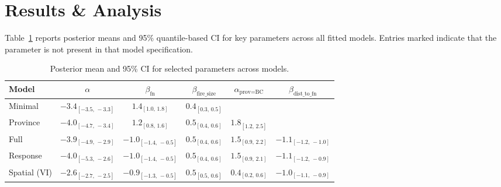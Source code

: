 \section{Results \& Analysis}\label{sec:results}

Table~\ref{tab:key_param_comparison} reports posterior means and 95\% quantile-based CI for key parameters across all fitted models. Entries marked \textemdash{} indicate that the parameter is not present in that model specification.

\begin{table}[h!]
\centering
\caption{Posterior mean and 95\% CI for selected parameters across models.}
\label{tab:key_param_comparison}
\begin{tabular}{lccccc}
\hline
Model & $\alpha$ & $\beta_{\mathrm{fn}}$ & $\beta_{\mathrm{fire\_size}}$ & $\alpha_{\text{prov=BC}}$ & $\beta_{\mathrm{dist\_to\_fn}}$ \\
\hline
Minimal & $-3.4_{[-3.5,\,-3.3]}$ & $1.4_{[1.0,\,1.8]}$ & $0.4_{[0.3,\,0.5]}$ & \textemdash{} & \textemdash{} \\
Province & $-4.0_{[-4.7,\,-3.4]}$ & $1.2_{[0.8,\,1.6]}$ & $0.5_{[0.4,\,0.6]}$ & $1.8_{[1.2,\,2.5]}$ & \textemdash{} \\
Full & $-3.9_{[-4.9,\,-2.9]}$ & $-1.0_{[-1.4,\,-0.5]}$ & $0.5_{[0.4,\,0.6]}$ & $1.5_{[0.9,\,2.2]}$ & $-1.1_{[-1.2,\,-1.0]}$ \\
Response & $-4.0_{[-5.3,\,-2.6]}$ & $-1.0_{[-1.4,\,-0.5]}$ & $0.5_{[0.4,\,0.6]}$ & $1.5_{[0.9,\,2.1]}$ & $-1.1_{[-1.2,\,-0.9]}$ \\
Spatial (VI) & $-2.6_{[-2.7,\,-2.5]}$ & $-0.9_{[-1.3,\,-0.5]}$ & $0.5_{[0.5,\,0.6]}$ & $0.4_{[0.2,\,0.6]}$ & $-1.0_{[-1.1,\,-0.9]}$ \\
\hline
\end{tabular}
\end{table}

